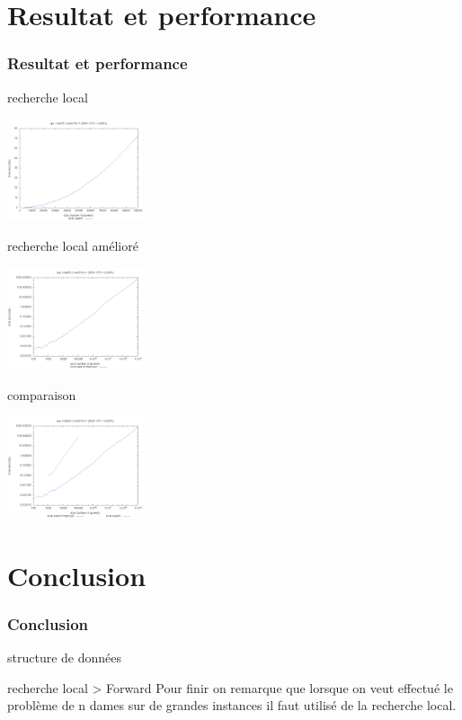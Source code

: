 \documentclass[9pt,a4paper]{beamer}
\begin{document}
\section{Resultat et performance}
\begin{frame}
	\frametitle{Resultat et performance}

	\begin{block}{recherche local}

	\includegraphics[width=0.3\textwidth]{images/plot_ls_i7.png}

	\end{block}

	\begin{block}{recherche local amélioré}

	\includegraphics[width=0.3\textwidth]{images/plot_lst_i7.png}

	\end{block}

	\begin{block}{comparaison}

	\includegraphics[width=0.3\textwidth]{images/plot_lst_ls_i7.png}

	\end{block}



\end{frame}

\section{Conclusion}
\begin{frame}
	\frametitle{Conclusion}

	\begin{block}{structure de données}


	\end{block}

	\begin{block}{recherche local > Forward}
		Pour finir on remarque que lorsque on veut effectué le problème de n dames sur de grandes instances il faut utilisé de la recherche local.
	\end{block}


\end{frame}
\end{document}
